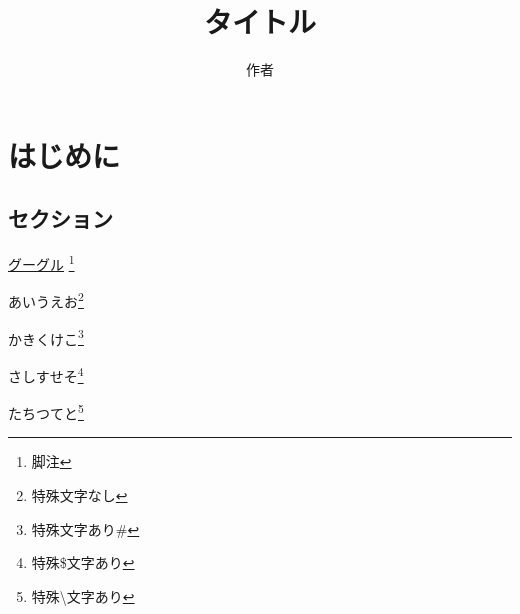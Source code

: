 \documentclass[uplatex, oneside]{jsbook}
\title{タイトル}
\author{作者}
\begin{document}
\maketitle
\tableofcontents

\chapter{はじめに}

\section{セクション}

\href{http://www.google.co.jp}{グーグル}
\footnote{脚注}

\newpage

あいうえお\footnote{特殊文字なし}

かきくけこ\footnote{特殊文字あり\#}

さしすせそ\footnote{特殊\$文字あり}

たちつてと\footnote{特殊\textbackslash 文字あり}
\end{document}
